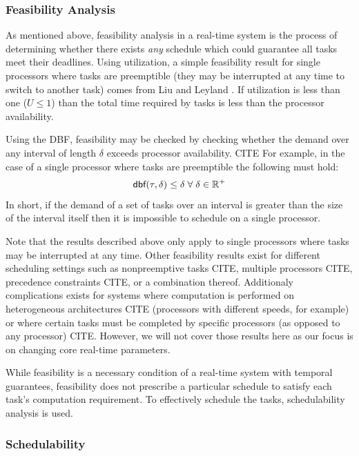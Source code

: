 \subsubsection{Feasibility Analysis}

As mentioned above, feasibility analysis in a real-time system is the process of determining whether there exists \textit{any} schedule which could guarantee all tasks meet their deadlines.
Using utilization, a simple feasibility result for single processors where tasks are preemptible (they may be interrupted at any time to switch to another task) comes from Liu and Leyland \cite{liu_scheduling_1973}.
If utilization is less than one ($U \leq 1$) than the total time required by tasks is less than the processor availability.

Using the DBF, feasibility may be checked by checking whether the demand over any interval of length $\delta$ exceeds processor availability. CITE
For example, in the case of a single processor where tasks are preemptible the following must hold:
\begin{equation}
    \mbox{\sf dbf}(\tau,\delta) \leq \delta \; \forall \; \delta \in \mathbb{R}^+
\end{equation}
In short, if the demand of a set of tasks over an interval is greater than the size of the interval itself then it is impossible to schedule on a single processor.

Note that the results described above only apply to single processors where tasks may be interrupted at any time.
Other feasibility results exist for different scheduling settings such as nonpreemptive tasks CITE, multiple processors CITE, precedence constraints CITE, or a combination thereof.
Additionaly complications exists for systems where computation is performed on heterogeneous architectures CITE (processors with different speeds, for example) or where certain tasks must be completed by specific processors (as opposed to any processor) CITE. 
However, we will not cover those results here as our focus is on changing core real-time parameters.

While feasibility is a necessary condition of a real-time system with temporal guarantees, feasibility does not prescribe a particular schedule to satisfy each task's computation requirement.
To effectively schedule the tasks, schedulability analysis is used.

\subsubsection{Schedulability}

